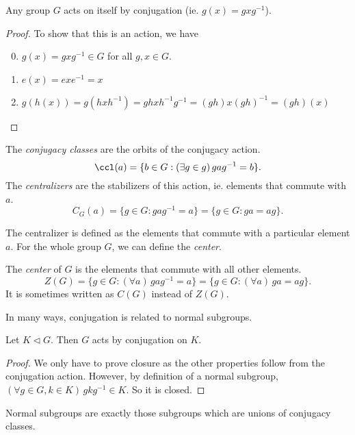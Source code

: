 \documentclass[a4paper]{article}
\begin{document}
\begin{lemma}
  Any group $G$ acts on itself by conjugation (ie. $g(x) = gxg^{-1}$).
\end{lemma}

\begin{proof}
  To show that this is an action, we have
  \begin{enumerate}[label=\arabic{*}.]
      \setcounter{enumi}{-1}
    \item $g(x) = gxg^{-1} \in G$ for all $g, x\in G$.
    \item $e(x) = exe^{-1} = x$
    \item $g(h(x)) = g(hxh^{-1}) = ghxh^{-1}g^{-1} = (gh)x(gh)^{-1} = (gh)(x)$
  \end{enumerate}
\end{proof}

\begin{defi}
  The \emph{conjugacy classes} are the orbits of the conjugacy action.
  \[
    \ccl(a) = \{b\in G: (\exists g\in g)\,gag^{-1} = b\}.
  \]
  The \emph{centralizers} are the stabilizers of this action, ie. elements that commute with $a$.
  \[
    C_G(a) = \{g\in G: gag^{-1} = a\} = \{g\in G: ga = ag\}.
  \]
\end{defi}
The centralizer is defined as the elements that commute with a particular element $a$. For the whole group $G$, we can define the \emph{center}.

\begin{defi}
  The \emph{center} of $G$ is the elements that commute with all other elements.
  \[
    Z(G) = \{g\in G: (\forall a)\,gag^{-1} = a\} = \{g\in G: (\forall a)\,ga = ag\}.
  \]
  It is sometimes written as $C(G)$ instead of $Z(G)$.
\end{defi}

In many ways, conjugation is related to normal subgroups.
\begin{lemma}
  Let $K\lhd G$. Then $G$ acts by conjugation on $K$.
\end{lemma}

\begin{proof}
  We only have to prove closure as the other properties follow from the conjugation action. However, by definition of a normal subgroup, $(\forall g\in G, k\in K)\,gkg^{-1}\in K$. So it is closed.
\end{proof}

\begin{prop}
  Normal subgroups are exactly those subgroups which are unions of conjugacy classes.
\end{prop}
\end{document}
